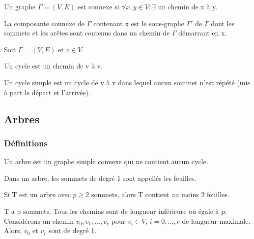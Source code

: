 \begin{defn}
Un graphe $\Gamma = (V,E)$ est connexe si $\forall x,y \in V : \exists $ un chemin de x à y. 

La composante connexe de $\Gamma$ contenant x est le sous-graphe ${\Gamma}'$ de $\Gamma$ dont les sommets et les arêtes sont contenus dans un chemin de $\Gamma$ démarrant en x. 
\end{defn}

\begin{defn}
Soit $\Gamma = (V,E)$ et $v \in V$.

Un cycle est un chemin de v à v.

Un cycle simple est un cycle de v à v dans lequel aucun sommet n'est répété (mis à part le départ et l'arrivée).
\end{defn}

\newpage


\subsection{Arbres}

\subsubsection{Définitions}

\begin{defn}
Un arbre est un graphe simple connexe qui ne contient aucun cycle.
\end{defn}

\begin{defn}
Dans un arbre, les sommets de degré 1 sont appellés les feuilles.
\end{defn}

\begin{exmp}

\end{exmp}



\begin{prop}
Si T est un arbre avec $p\geq2$ sommets, alors T contient au moins 2 feuilles.
\end{prop}

\begin{demo}
T a p sommets. Tous les chemins sont de longueur inférieure ou égale à p. Considérons un chemin $v_{0},v_{1},\ldots,v_{r}$ pour $v_{i} \in V$, $i=0,\ldots,r$ de longueur maximale. Alors, $v_{0}$ et $v_{r}$ sont de degré 1.
\end{demo}

